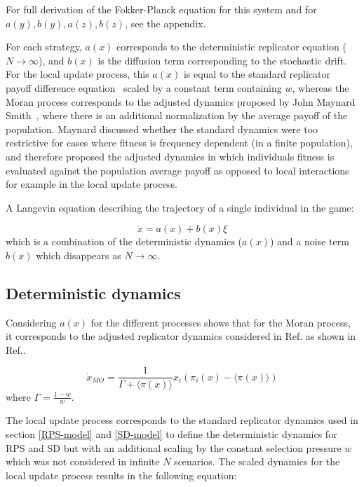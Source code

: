 \documentclass[%
 reprint,
 amsmath,amssymb,
 aps,
]{revtex4-2}
\begin{document}
For full derivation of the Fokker-Planck equation for this system and for 
$a(y), b(y), a(z), b(z)$,
see the appendix.


For each strategy, $a(x)$ corresponds to the deterministic replicator equation ($N \rightarrow \infty$),
and $b(x)$ is the diffusion term corresponding to the stochastic drift. 
For the local update process, this $a(x)$ is equal to the standard replicator payoff difference equation~\cite{evolution_pop_dynamics}
scaled by a constant term containing $w$,
whereas the Moran process corresponds to the adjusted dynamics proposed by John Maynard 
Smith~\cite{evolution_maynard}, 
where there is an additional normalization by the average payoff of the population.
Maynard discussed whether the standard dynamics were too restrictive for cases
where fitness is frequency dependent (in a finite population), and therefore proposed the 
adjusted dynamics in which individuals fitness is evaluated against the population average payoff as opposed to 
local interactions for example in the local update process.

A Langevin equation describing the trajectory of a single individual in the
game:

\begin{equation}
\dot{x} = a(x) + b(x) \xi
\end{equation}
which is a combination of the deterministic dynamics ($a(x)$) and a noise term 
$b(x)$ which disappears as $N \rightarrow \infty$.

\subsection{Deterministic dynamics}

Considering $a(x)$ for the different processes shows
that for the Moran process, it corresponds to the adjusted 
replicator dynamics considered in Ref.\cite{evolution_maynard} as shown in 
Ref.\cite{drift_reversal_paper}.

\begin{equation}
\dot{x}_{MO} = \frac{1}{\Gamma + \langle \pi(x)\rangle} x_i(\pi_i(x) - \langle \pi(x)\rangle)
\end{equation}
where $\Gamma = \frac{1- w}{w}$.

The local update process corresponds to the standard replicator 
dynamics \cite{evolution_pop_dynamics} used in section
\ref{RPS-model} and \ref{SD-model} to define the deterministic dynamics
for RPS and SD but with an additional scaling by the
constant selection pressure
$w$ which was not considered in infinite $N$ scenarios.
The scaled dynamics for the local update process results in the following equation:
\end{document}
